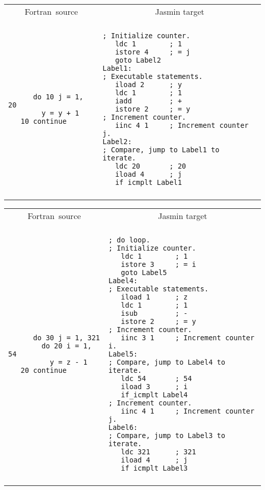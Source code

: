 \documentclass{article}
\begin{document}
{\newpage
\clearpage
\samepage \begin{tabular}{ll}\hline
\multicolumn{1}{c}{{\sc Fortran}\ source}
&  
\multicolumn{1}{c}{Jasmin target} \\ 
\\ \hline
\begin{minipage}[t]{2in}
\begin{verbatim}      do 10 j = 1, 20
        y = y + 1
   10 continue\end{verbatim}
\end{minipage}
&
\begin{minipage}[t]{3in}
\begin{verbatim}; Initialize counter.
   ldc 1        ; 1
   istore 4     ; = j
   goto Label2
Label1:
; Executable statements.
   iload 2      ; y
   ldc 1        ; 1
   iadd         ; +
   istore 2     ; = y
; Increment counter.
   iinc 4 1     ; Increment counter j.
Label2:
; Compare, jump to Label1 to iterate.
   ldc 20       ; 20
   iload 4      ; j
   if_icmplt Label1\end{verbatim}
\end{minipage}\\ 
\\ \hline
\end{tabular}
}

{\newpage
\clearpage
\samepage \begin{tabular}{ll}\hline
\multicolumn{1}{c}{{\sc Fortran}\ source}
&  
\multicolumn{1}{c}{Jasmin target} \\ 
\\ \hline
\begin{minipage}[t]{2in}
\begin{verbatim}      do 30 j = 1, 321
        do 20 i = 1, 54
          y = z - 1
   20 continue\end{verbatim}
\end{minipage}
&
\begin{minipage}[t]{3in}
\begin{verbatim}; do loop.
; Initialize counter.
   ldc 1        ; 1
   istore 3     ; = i
   goto Label5
Label4:
; Executable statements.
   iload 1      ; z
   ldc 1        ; 1
   isub         ; -
   istore 2     ; = y
; Increment counter.
   iinc 3 1     ; Increment counter i.
Label5:
; Compare, jump to Label4 to iterate.
   ldc 54       ; 54
   iload 3      ; i
   if_icmplt Label4
; Increment counter.
   iinc 4 1     ; Increment counter j.
Label6:
; Compare, jump to Label3 to iterate.
   ldc 321      ; 321
   iload 4      ; j
   if_icmplt Label3\end{verbatim}
\end{minipage}\\ 
\\ \hline
\end{tabular}
}
\end{document}
